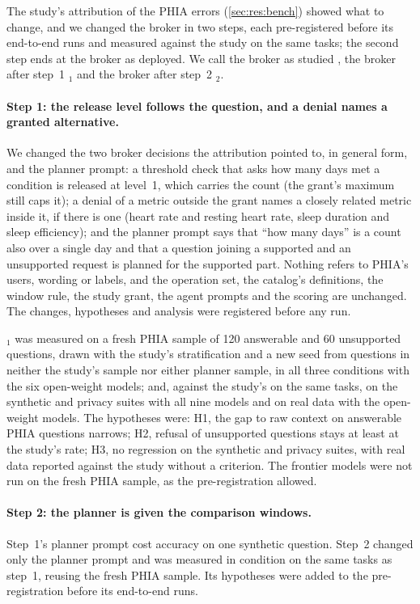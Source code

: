 The study's attribution of the PHIA errors (\cref{sec:res:bench}) showed what to change, and we changed the broker in
two steps, each pre-registered before its end-to-end runs and measured against the study on the same tasks; the
second step ends at the broker as deployed. We call the broker as studied \CC{}, the broker after step~1 \CC{}$_1$
and the broker after step~2 \CC{}$_2$.

\paragraph{Step 1: the release level follows the question, and a denial names a granted alternative.} We changed the
two broker decisions the attribution pointed to, in general form, and the planner prompt: a threshold check that asks
how many days met a condition is released at level~1, which carries the count (the grant's maximum still caps it); a
denial of a metric outside the grant names a closely related metric inside it, if there is one (heart rate and
resting heart rate, sleep duration and sleep efficiency); and the planner prompt says that ``how many days'' is a
count also over a single day and that a question joining a supported and an unsupported request is planned for the
supported part. Nothing refers to PHIA's users, wording or labels, and the operation set, the catalog's definitions,
the window rule, the study grant, the agent prompts and the scoring are unchanged. The changes, hypotheses and
analysis were registered before any run.

\CC{}$_1$ was measured on a fresh PHIA sample of 120 answerable and 60 unsupported questions, drawn with the study's
stratification and a new seed from questions in neither the study's sample nor either planner sample, in all three
conditions with the six open-weight models; and, against the study's \CC{} on the same tasks, on the synthetic and
privacy suites with all nine models and on real data with the open-weight models. The hypotheses were: H1, the gap
to raw context on answerable PHIA questions narrows; H2, refusal of unsupported questions stays at least at the
study's rate; H3, no regression on the synthetic and privacy suites, with real data reported against the study
without a criterion. The frontier models were not run on the fresh PHIA sample, as the pre-registration allowed.

\paragraph{Step 2: the planner is given the comparison windows.} Step~1's planner prompt cost accuracy on one
synthetic question. Step~2 changed only the planner prompt and was measured in condition \CC{} on the same tasks as
step~1, reusing the fresh PHIA sample. Its hypotheses were added to the pre-registration before its end-to-end runs.

